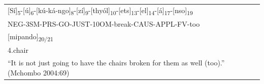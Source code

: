 \begin{tabular}{@{}l@{}}
\Large \textcolor{planarhighlight}{[Sí]\textsubscript{5}}-\textcolor{planarhighlight}{[ú]\textsubscript{6}}-\textcolor{planarhighlight}{[kú-ká-ngo]\textsubscript{8}}-\textcolor{planarhighlight}{[zí]\textsubscript{9}}-\textcolor{planarhighlight}{[thyól]\textsubscript{10}}-\textcolor{planarhighlight}{[ets]\textsubscript{13}}-\textcolor{planarhighlight}{[el]\textsubscript{14}}-\textcolor{planarhighlight}{[á]\textsubscript{17}}-\textcolor{planarhighlight}{[nso]\textsubscript{19}} \\[4pt]
\large NEG-3SM-PRS-GO-JUST-10OM-break-CAUS-APPL-FV-too \\[12pt]
\Large \textcolor{planarhighlight}{[mipando]\textsubscript{20/21}} \\[4pt]
\large 4.chair \\[12pt]
\parbox[t]{364.78497pt}{\raggedright\Large ``It is not just going to have the chairs broken for them as well (too).'' (Mchombo 2004:69)} \\
\end{tabular}
